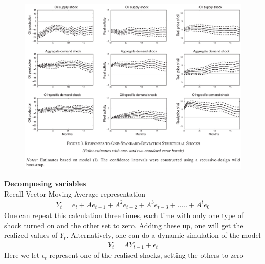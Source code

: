 \documentclass{beamer}
\begin{document}
\begin{frame}
  \begin{figure}
    \includegraphics[scale=.7]{killian3.eps}
  \end{figure}
\end{frame}

\begin{frame}
  \textbf{Decomposing variables}\\
  Recall Vector Moving Average representation    
\begin{align*}
  Y_t = e_t + Ae_{t-1} + A^2e_{t-2} + A^3e_{t-3} + ..... + A^te_0
\end{align*}
\medskip
One can repeat this calculation three times, each time with only one type of shock turned on and the other set to zero. 
Adding these up, one will get the realized values of $Y_t$.
Alternatively, one can do a dynamic simulation of the model
\begin{align*}
  Y_t=AY_{t-1}+\epsilon_t
\end{align*}
Here we let $\epsilon_t$ represent one of the realised shocks, setting the others to zero
\end{frame}
\end{document}

